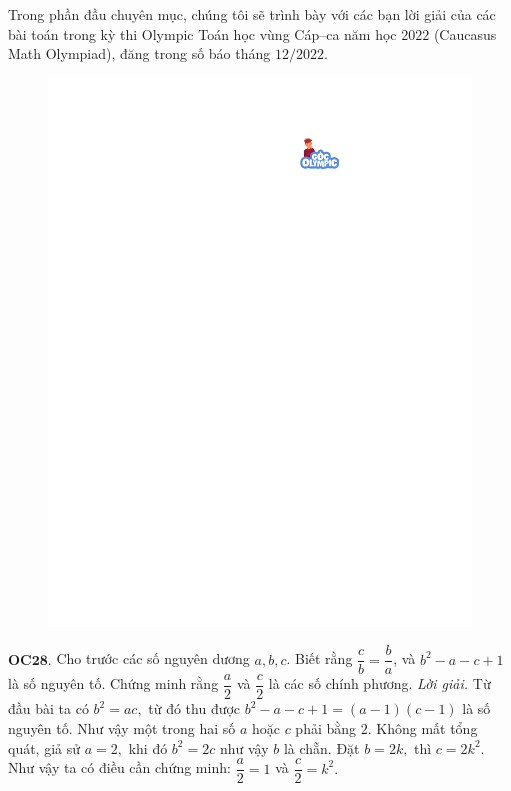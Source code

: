 \begin{multicols}{2}
	Trong phần đầu chuyên mục, chúng tôi sẽ trình bày với các bạn lời giải của các bài toán trong kỳ thi Olympic Toán học vùng Cáp--ca năm học $2022$ (Caucasus Math Olympiad), đăng trong số báo tháng $12/2022$. 
	\begin{figure}[H]
		\vspace*{-5pt}
		\centering
		\captionsetup{labelformat= empty, justification=centering}
		\includegraphics[width= 1\linewidth]{gocolympic}
		\vspace*{-10pt}
	\end{figure}
	{\bf\color{cackithi} OC$\pmb{28.}$} Cho trước các số nguyên dương $a, b, c$. Biết rằng $\dfrac{c}{b} = \dfrac{b}{a}$, và $b^2 - a - c + 1$ là số nguyên tố. Chứng minh rằng $\dfrac{a}{2}$ và $\dfrac{c}{2}$ là các số chính phương.
	\vskip 0.1cm
	\textit{Lời giải.} Từ đầu bài ta có $b^2=ac,$ từ đó thu được  $b^2 - a - c + 1=(a-1)(c-1)$ là số nguyên tố. Như vậy một trong hai số $a$ hoặc $c$ phải bằng $2$. Không mất tổng quát, giả sử $a=2,$ khi đó $b^2=2c$ như vậy $b$ là chẵn. Đặt $b=2k,$ thì $c=2k^2.$ Như vậy ta có điều cần chứng minh: $\dfrac{a}{2}=1$ và $\dfrac{c}{2}=k^2.$

\end{multicols}
